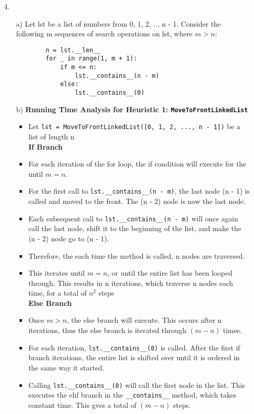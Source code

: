 \documentclass[fontsize=11pt]{article}
\begin{document}
\begin{enumerate}
\item[4.]
\begin{enumerate}
    \item [a)] Let lst be a list of numbers from 0, 1, 2, .., n - 1. Consider the following m sequences of search operations on lst, where $m > n$:
    \begin{verbatim}
        n = lst.__len__
        for _ in range(1, m + 1):
            if m <= n:
                lst.__contains__(n - m)
            else:
                lst.__contains__(0)
    \end{verbatim}
    \item[b)] \textbf{Running Time Analysis for Heuristic 1: \texttt{MoveToFrontLinkedList}}
    \begin{itemize}
        \item Let \texttt{lst = MoveToFrontLinkedList([0, 1, 2, ..., n - 1])} be a list of length n\\
        
        \textbf{If Branch}
        \item For each iteration of the for loop, the if condition will execute for the until $m = n$.
        \item For the first call to \texttt{lst.\_\_contains\_\_(n - m)}, the last node (n - 1) is called and moved to the front. The (n - 2) node is now the last node. 
        \item Each subsequent call to \texttt{lst.\_\_contains\_\_(n - m)} will once again call the last node, shift it to the beginning of the list, and make the (n - 2) node go to (n - 1).
        \item Therefore, the each time the method is called, n nodes are traversed.
        \item This iterates until $m = n$, or until the entire list has been looped through. This results in n iterations, which traverse n nodes each time, for a total of $n^2$ steps\\
        
        \textbf{Else Branch}
        \item Once $m > n$, the else branch will execute. This occurs after n iterations, thus the else branch is iterated through $(m - n)$ times.
        \item For each iteration, \texttt{lst.\_\_contains\_\_(0)} is called. After the first if branch iterations, the entire list is shifted over until it is ordered in the same way it started.
        \item Calling \texttt{lst.\_\_contains\_\_(0)} will call the first node in the list. This executes the elif branch in the \texttt{\_\_contains\_\_} method, which takes constant time. This gves a total of $(m - n)$ steps.\\
        

\end{itemize}
\end{enumerate}
\end{enumerate}
\end{document}
